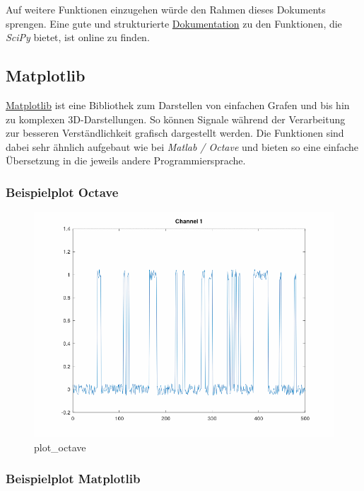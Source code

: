 \documentclass[11pt]{article}
\begin{document}
Auf weitere Funktionen einzugehen würde den Rahmen dieses Dokuments
sprengen. Eine gute und strukturierte
\href{https://scipy.github.io/devdocs/}{Dokumentation} zu den
Funktionen, die \emph{SciPy} bietet, ist online zu finden.

\hypertarget{matplotlib}{%
\subsection{Matplotlib}\label{matplotlib}}

\href{https://matplotlib.org/}{Matplotlib} ist eine Bibliothek zum
Darstellen von einfachen Grafen und bis hin zu komplexen
3D-Darstellungen. So können Signale während der Verarbeitung zur
besseren Verständlichkeit grafisch dargestellt werden. Die Funktionen
sind dabei sehr ähnlich aufgebaut wie bei \emph{Matlab / Octave} und
bieten so eine einfache Übersetzung in die jeweils andere
Programmiersprache.

\hypertarget{beispielplot-octave}{%
\subsubsection{Beispielplot Octave}\label{beispielplot-octave}}

\begin{figure}
\centering
\includegraphics{images/plot_octave.png}
\caption{plot\_octave}
\end{figure}

\hypertarget{beispielplot-matplotlib}{%
\subsubsection{Beispielplot Matplotlib}\label{beispielplot-matplotlib}}
\end{document}
